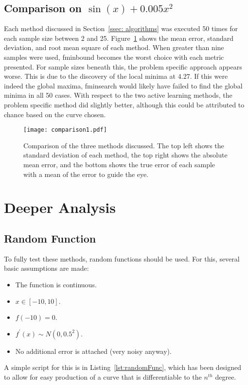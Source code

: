 \subsection[Comparison One]{Comparison on $\sin(x)+0.005x^2$}
\label{ssec:comp1}
Each method discussed in Section~\ref{ssec: algorithms} was executed 50 times for each sample size between 2 and 25. Figure~\ref{fig:firstComparison} shows the mean error, standard deviation, and root mean square of each method. When greater than nine samples were used, fminbound \cite{2020SciPy-NMeth} becomes the worst choice with each metric presented. For sample sizes beneath this, the problem specific approach appears worse. This is due to the discovery of the local minima at $4.27$. If this were indeed the global maxima, fminsearch would likely have failed to find the global minima in all 50 cases. With respect to the two active learning methods, the problem specific method did slightly better, although this could be attributed to chance based on the curve chosen.

\begin{figure}[htbp!] 
  \centering    
  \texttt{[image: comparison1.pdf]}
  \caption[First Comparison]{Comparison of the three methods discussed. The top left shows the standard deviation of each method, the top right shows the absolute mean error, and the bottom shows the true error of each sample with a mean of the error to guide the eye.}
  \label{fig:firstComparison}
\end{figure}

\section{Deeper Analysis}
\subsection{Random Function}
To fully test these methods, random functions should be used. For this, several basic assumptions are made:
\begin{itemize}
  \item The function is continuous.
  \item $x\in[-10, 10]$.
  \item $f(-10)=0$.
  \item $f^{\prime}(x)\sim N(0, 0.5^2)$.
  \item No additional error is attached (very noisy anyway).
\end{itemize}
A simple script for this is in Listing~\ref{lst:randomFunc}, which has been designed to allow for easy production of a curve that is differentiable to the $n^{th}$ degree.

